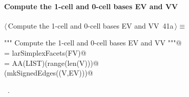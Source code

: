 \documentclass[11pt,oneside]{article}    %
\begin{document}
\paragraph{Compute the 1-cell and 0-cell bases EV and VV}
\begin{flushleft} \small \label{scrap65}
\protect{}$\langle\,$Compute the 1-cell and 0-cell bases EV and VV\nobreak\ {\footnotesize 41a}$\,\rangle\equiv$
\vspace{-1ex}
\begin{list}{}{} \item
\mbox{}\verb@""" Compute the 1-cell and 0-cell bases EV and VV """@\\
\mbox{}\verb@EV = larSimplexFacets(FV)@\\
\mbox{}\verb@VV = AA(LIST)(range(len(V)))@\\
\mbox{}\verb@VIEW(mkSignedEdges((V,EV)))@\\
\mbox{}\verb@@{\NWsep}
\end{list}
\vspace{-1ex}
\footnotesize\addtolength{\baselineskip}{-1ex}
\begin{list}{}{\setlength{\itemsep}{-\parsep}\setlength{\itemindent}{-\leftmargin}}
\item \NWtxtMacroRefIn\ .
\end{list}
\end{flushleft}
\end{document}
